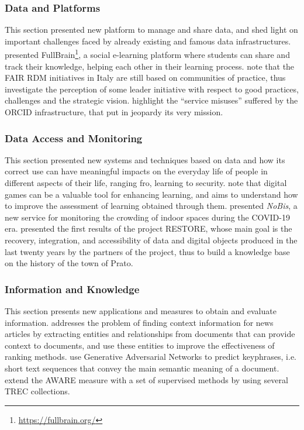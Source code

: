 \documentclass[sigconf, nonacm]{acmart}
\begin{document}
\subsubsection*{Data and Platforms}
This section presented new platform to manage and share data, and shed light on important challenges faced by already existing and famous data infrastructures.
\citet{biasini2021fullbrain} presented FullBrain\footnote{\url{https://fullbrain.org/}}, a social e-learning platform where students can share and track their knowledge, helping each other in their learning process.
\citet{GargiuloGTZ21} note that the FAIR RDM initiatives in Italy are still based on communities of practice, thus investigate the perception of some leader initiative with respect to good practices, challenges and the strategic vision. 
\citet{BaglioniMMABB21} highlight the ``service misuses'' suffered by the ORCID infrastructure, that put in jeopardy its very mission.

\subsubsection*{Data Access and Monitoring}
This section presented new systems and techniques based on data and how its correct use can have meaningful impacts on the everyday life of people in different aspects of their life, ranging fro, learning to security.
\citet{ZanichelliETTC21} note that digital games can be a valuable tool for enhancing learning, and aims to understand how to improve the assessment of learning obtained through them.
\citet{AvanziCCG021} presented \emph{NoBis}, a new service for monitoring the crowding of indoor spaces during the COVID-19 era.
\citet{SpadiSD21} presented the first results of the project RESTORE, whose main goal is the recovery, integration, and accessibility of data and digital objects produced in the last twenty years by the partners of the project, thus to build a knowledge base on the history of the town of Prato.


\subsubsection*{Information and Knowledge}
This section presents new applications and measures to obtain and evaluate information. 
\citet{IrreraS21} addresses the problem of finding context information for news articles by extracting entities and relationships from documents that can provide context to documents, and use these entities to improve the effectiveness of ranking methods.
\citet{LancioniMP0T21} use Generative Adversarial Networks to predict keyphrases, i.e. short text sequences that convey the main semantic meaning of a document. 
\citet{Ferrante0P21} extend the AWARE measure with a set of supervised methods by using several TREC collections. 
\end{document}
